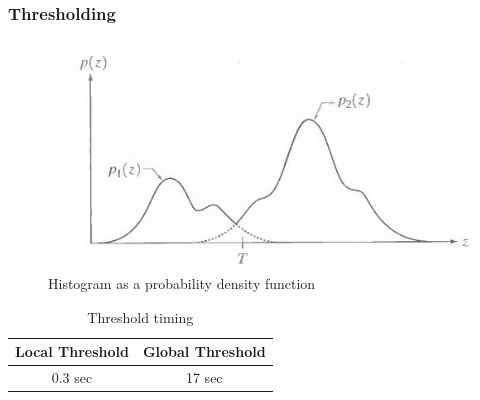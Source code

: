\subsubsection{Thresholding}
\begin{figure}[htb]
	\begin{center}
		\includegraphics[width=0.8\linewidth]{bilder/Gonzalez.png}
		\caption{Histogram as a probability density function}\label{fig:gmm}
	\end{center}
\end{figure}

\begin{table}
\centering
    \begin{tabular}{||c c||} 
     \hline
     Local Threshold & Global Threshold \\ [0.5ex] 
     \hline\hline
     0.3 sec & 17 sec  \\ 
     \hline
    \end{tabular}
    \caption{Threshold timing}
    \label{tab:threshold-timing}
\end{table}

